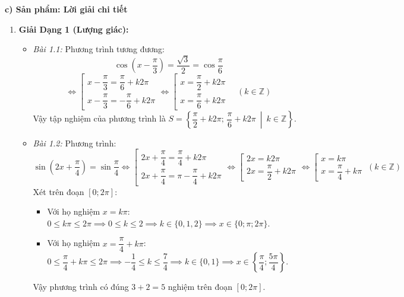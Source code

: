\documentclass[12pt, a4paper]{article}
\begin{document}
\noindent \textbf{c) Sản phẩm: Lời giải chi tiết}
\begin{enumerate}[leftmargin=0.6cm]
    \item \textbf{Giải Dạng 1 (Lượng giác):}
    \begin{itemize}
        \item \textit{Bài 1.1:} Phương trình tương đương:
        $$\cos\left(x - \dfrac{\pi}{3}\right) = \dfrac{\sqrt{3}}{2} = \cos\dfrac{\pi}{6}$$
        $$\iff \left[\begin{array}{l} x - \dfrac{\pi}{3} = \dfrac{\pi}{6} + k2\pi \\ x - \dfrac{\pi}{3} = -\dfrac{\pi}{6} + k2\pi \end{array}\right. \iff \left[\begin{array}{l} x = \dfrac{\pi}{2} + k2\pi \\ x = \dfrac{\pi}{6} + k2\pi \end{array}\right. \quad (k \in \mathbb{Z})$$
        Vậy tập nghiệm của phương trình là $S = \left\{\dfrac{\pi}{2} + k2\pi; \, \dfrac{\pi}{6} + k2\pi \ \middle|\ k \in \mathbb{Z}\right\}$.

        \item \textit{Bài 1.2:} Phương trình:
        $$\sin\left(2x + \dfrac{\pi}{4}\right) = \sin\dfrac{\pi}{4} \iff \left[\begin{array}{l} 2x + \dfrac{\pi}{4} = \dfrac{\pi}{4} + k2\pi \\ 2x + \dfrac{\pi}{4} = \pi - \dfrac{\pi}{4} + k2\pi \end{array}\right. \iff \left[\begin{array}{l} 2x = k2\pi \\ 2x = \dfrac{\pi}{2} + k2\pi \end{array}\right. \iff \left[\begin{array}{l} x = k\pi \\ x = \dfrac{\pi}{4} + k\pi \end{array}\right. \ (k \in \mathbb{Z})$$
        Xét trên đoạn $[0; 2\pi]$:
        \begin{itemize}
            \item Với họ nghiệm $x = k\pi$: $0 \le k\pi \le 2\pi \implies 0 \le k \le 2 \implies k \in \{0, 1, 2\} \implies x \in \{0; \pi; 2\pi\}$.
            \item Với họ nghiệm $x = \dfrac{\pi}{4} + k\pi$: $0 \le \dfrac{\pi}{4} + k\pi \le 2\pi \implies -\dfrac{1}{4} \le k \le \dfrac{7}{4} \implies k \in \{0, 1\} \implies x \in \left\{\dfrac{\pi}{4}; \dfrac{5\pi}{4}\right\}$.
        \end{itemize}
        Vậy phương trình có đúng $3 + 2 = 5$ nghiệm trên đoạn $[0; 2\pi]$.
    \end{itemize}


\end{enumerate}
\end{document}
